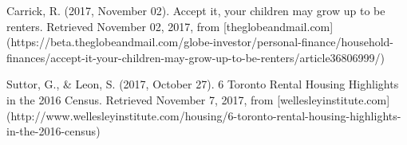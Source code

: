 \begin{thebibliography}{9}
  Carrick, R. (2017, November 02). Accept it, your children may grow up to be renters. Retrieved November 02, 2017, from [theglobeandmail.com](https://beta.theglobeandmail.com/globe-investor/personal-finance/household-finances/accept-it-your-children-may-grow-up-to-be-renters/article36806999/)

  Suttor, G., \& Leon, S. (2017, October 27). 6 Toronto Rental Housing Highlights in the 2016 Census. Retrieved November 7, 2017, from [wellesleyinstitute.com](http://www.wellesleyinstitute.com/housing/6-toronto-rental-housing-highlights-in-the-2016-census)


\end{thebibliography}

